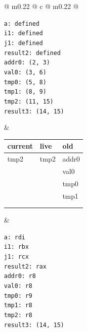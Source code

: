 \begin{figure}[H]
    \centering
    \small
    \begin{tabularx}{\textwidth}{@{} m{} @{\extracolsep{\fill}} c @{\extracolsep{\fill}} m{} @{}}
        \begin{tcolorbox}[standard jigsaw, opacityback=0, colframe=black, arc=4mm, width=\linewidth, height=6.2cm, valign=center, left=2pt, right=2pt]
            \texttt{\small a: defined \\ i1: defined \\ j1: defined \\ result2: defined \\ addr0: (2, 3) \\ val0: (3, 6) \\ tmp0: (5, 8) \\ tmp1: (8, 9) \\ tmp2: (11, 15) \\ result3: (14, 15)}
        \end{tcolorbox} 
        & 
        \renewcommand{\arraystretch}{1.3}
        \begin{tabular}{|p{2cm}|p{2cm}|p{2cm}|}
            \hline
            \textbf{current} & \textbf{live} & \textbf{old} \\ \hline
             tmp2   & tmp2  & addr0 \\ \hline
                    &       & val0  \\ \hline
                    &       & tmp0  \\ \hline
                    &       & tmp1  \\ \hline
                    &       &       \\ \hline
            & & \\ \hline
        \end{tabular} 
        & 
        \begin{tcolorbox}[standard jigsaw, opacityback=0, colframe=black, arc=4mm, width=\linewidth, height=6.2cm, valign=center, left=2pt, right=2pt]
            \texttt{\small a: rdi \\ i1: rbx \\ j1: rcx \\ result2: rax \\ addr0: r8 \\ val0: r8 \\ tmp0: r9 \\ tmp1: r8 \\ tmp2: r8 \\ result3: (14, 15)}
        \end{tcolorbox} \\
    \end{tabularx}
\end{figure}


